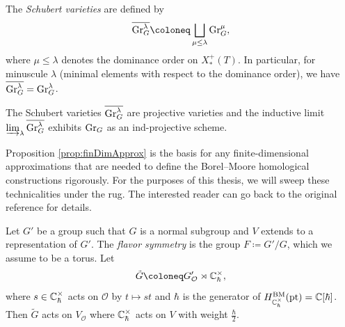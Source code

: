 \begin{definition}
	The \emph{Schubert varieties} are defined by
    \begin{equation}
        \overline{\textup{Gr}_G^\lambda} \coloneq \bigsqcup_{\mu \leq \lambda} \textup{Gr}_G^\mu,
    \end{equation}
    where $\mu \leq \lambda$ denotes the dominance order on $X_*^+(T)$. In particular, for minuscule $\lambda$ (minimal elements with respect to the dominance order), we have $\overline{\textup{Gr}_G^\lambda} = \textup{Gr}_G^\lambda$.
\end{definition}

\begin{prop}\label{prop:finDimApprox}
	The Schubert varieties $\overline{\textup{Gr}_G^\lambda}$ are projective varieties and the inductive limit $\varinjlim_\lambda \overline{\textup{Gr}_G^\lambda}$ exhibits $\textup{Gr}_G$ as an ind-projective scheme.
\end{prop}

\begin{remark}
	Proposition \ref{prop:finDimApprox} is the basis for any finite-dimensional approximations that are needed to define the Borel--Moore homological constructions rigorously. For the purposes of this thesis, we will sweep these technicalities under the rug. The interested reader can go back to the original reference \cite{braverman_towards_2018} for details.
\end{remark}

\begin{definition}
	Let $G'$ be a group such that $G$ is a normal subgroup and $V$ extends to a representation of $G'$. The \emph{flavor symmetry} is the group $F \coloneq G'/G$, which we assume to be a torus. Let
	\begin{equation}
		\tilde G \coloneq G_\mathcal{O}' \rtimes \C_\hbar^\times,
	\end{equation}
	where $s \in \mathbb{C}_\hbar^\times$ acts on $\mathcal{O}$ by $t \mapsto st$ and $\hbar$ is the generator of $H_{\mathbb{C}_\hbar^\times}^\textup{BM}(\textup{pt}) = \mathbb{C}[\hbar]$. Then $\tilde G$ acts on $V_\mathcal{O}$ where $\mathbb{C}_\hbar^\times$ acts on $V$ with weight $\frac{\hbar}{2}$.
\end{definition}

